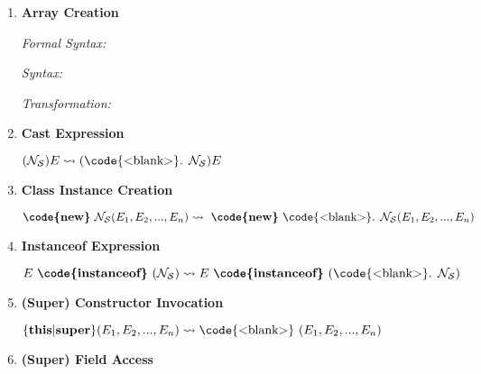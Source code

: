\begin{enumerate}[label=\roman*.]
    \item \textbf{Array Creation}

    \textit{Formal Syntax:} 

    \textit{Syntax:} 
    
    \textit{Transformation:}    
    \item \textbf{Cast Expression}

 
    $(\mathcal{N}_{\mathcal{S}}) E \rightsquigarrow (\text{\code{<blank>}. }\mathcal{N}_{\mathcal{S}}) E$    
    \item \textbf{Class Instance Creation}


    $\text{\textbf{\code{new}} }\mathcal{N}_{\mathcal{S}}(E_1, E_2, ..., E_n) \rightsquigarrow\text{ \textbf{\code{new}} \code{<blank>}. }\mathcal{N}_{\mathcal{S}}(E_1, E_2, ..., E_n)$    
    \item \textbf{Instanceof Expression}

    
    $E\text{ \textbf{\code{instanceof}} }(\mathcal{N}_{\mathcal{S}}) \rightsquigarrow E\text{ \textbf{\code{instanceof}} }( \text{\code{<blank>}. }\mathcal{N}_{\mathcal{S}})$
%
%    
    \item \textbf{(Super) Constructor Invocation}


    $\{\text{\textbf{this}}\vert\text{\textbf{super}\}}(E_1, E_2, ..., E_n) \rightsquigarrow \text{\code{<blank>} }(E_1, E_2, ..., E_n)$    
    \item \textbf{(Super) Field Access}


\end{enumerate}
